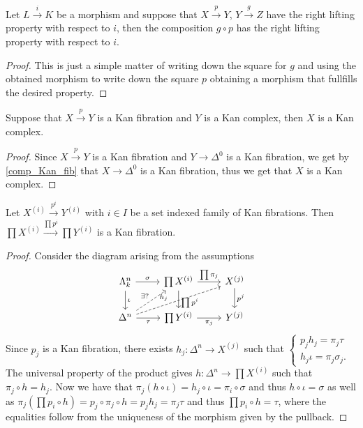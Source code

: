 \begin{prop}
\label{comp_Kan_fib}
    Let $L \xrightarrow{i} K$ be a morphism and suppose that $X \xrightarrow{p} Y$, $Y \xrightarrow{g} Z$ have the right lifting property with respect to $i$, then the composition $g \circ p$ has the right lifting property with respect to $i$.
\end{prop}

\begin{proof}
    This is just a simple matter of writing down the square for $g$ and using the obtained morphism to write down the square $p$ obtaining a morphism that fullfills the desired property.
\end{proof}

\begin{cor}
    Suppose that $X \xrightarrow{p} Y$ is a Kan fibration and $Y$ is a Kan complex, then $X$ is a Kan complex.
\end{cor}

\begin{proof}
    Since $X \xrightarrow{p} Y$ is a Kan fibration and $Y \to \Delta^0$ is a Kan fibration, we get by \cref{comp_Kan_fib} that $X \to \Delta^0$ is a Kan fibration, thus we get that $X$ is a Kan complex.
\end{proof}

\begin{prop}
    Let $X^{(i)} \xrightarrow{p^i} Y^{(i)}$ with $i \in I$ be a set indexed family of Kan fibrations.
    Then $\prod X^{(i)} \xrightarrow{\prod p^i} \prod Y^{(i)}$ is a Kan fibration.
\end{prop}

\begin{proof}
Consider the diagram arising from the assumptions
\[
    \begin{tikzcd}
        \Lambda_k^n
        \ar[r,"\sigma"]
        \ar[d,"\iota"]
        &
        \prod X^{(i)}
        \ar[d, "\prod p^i" pos=0.7]
        \ar[r, "\prod \pi_j"]
        &
        X^{(j)}
        \ar[d, "p^j"]
        \\
        \Delta^n
        \ar[ru, dashed, "\exists ?"]
        \ar[rru, dashed, "h_j" pos=0.4]
        \ar[r, "\tau"']
        &
        \prod Y^{(i)}
        \ar[r, "\pi_j"']
        &
        Y^{(j)}
    \end{tikzcd}
\]
Since $p_j$ is a Kan fibration, there exists $h_j \colon \Delta^n \to X^{(j)}$ such that 
$\begin{cases}
    p_jh_j=\pi_j\tau\\
    h_j\iota = \pi_j \sigma_j.
\end{cases}$
    The universal property of the product gives $h \colon \Delta^n \to \prod X^{(i)}$ such that $\pi_j \circ h = h_j$.
    Now we have that $\pi_j(h \circ \iota ) = h_j \circ \iota = \pi_i \circ \sigma$ and thus $h \circ \iota = \sigma$ as well as $\pi_j(\prod {p_i} \circ h) = p_j \circ \pi_j \circ h = p_j h_j = \pi_j \tau$ and thus $\prod p_i \circ h = \tau$, where the equalities follow from the uniqueness of the morphism given by the pullback.
\end{proof}

